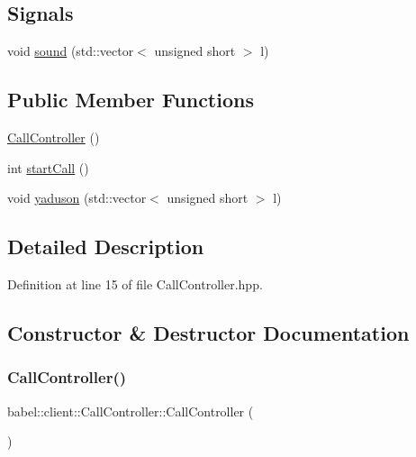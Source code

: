 \subsection*{Signals}
\begin{DoxyCompactItemize}
\item 
void \mbox{\hyperlink{classbabel_1_1client_1_1_call_controller_ac230bb212b81b400d317f7463a548e73}{sound}} (std\+::vector$<$ unsigned short $>$ l)
\end{DoxyCompactItemize}
\subsection*{Public Member Functions}
\begin{DoxyCompactItemize}
\item 
\mbox{\hyperlink{classbabel_1_1client_1_1_call_controller_af7637f3b0d8ea7508a93a5f7b827bee4}{Call\+Controller}} ()
\item 
int \mbox{\hyperlink{classbabel_1_1client_1_1_call_controller_ad5957a47309c9a12a5d37253c917bbb2}{start\+Call}} ()
\item 
void \mbox{\hyperlink{classbabel_1_1client_1_1_call_controller_af9f55a645c329a970a5f4bb9e10109da}{yaduson}} (std\+::vector$<$ unsigned short $>$ l)
\end{DoxyCompactItemize}


\subsection{Detailed Description}


Definition at line 15 of file Call\+Controller.\+hpp.



\subsection{Constructor \& Destructor Documentation}
\mbox{\label{classbabel_1_1client_1_1_call_controller_af7637f3b0d8ea7508a93a5f7b827bee4}} 
\subsubsection{\texorpdfstring{Call\+Controller()}{CallController()}}
{\footnotesize\ttfamily babel\+::client\+::\+Call\+Controller\+::\+Call\+Controller (\begin{DoxyParamCaption}{ }\end{DoxyParamCaption})}



